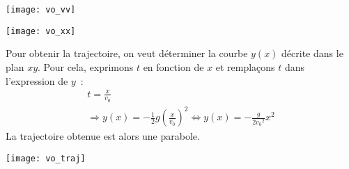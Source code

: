 \documentclass[../main/main.tex]{subfiles}
\begin{document}
\begin{minipage}{0.48\linewidth}
    \begin{center}
        \texttt{[image: vo\_vv]}
    \end{center}
\end{minipage}
\hfill
\begin{minipage}{0.48\linewidth}
    \begin{center}
        \texttt{[image: vo\_xx]}
    \end{center}
\end{minipage} \bigbreak

\begin{minipage}{0.60\linewidth}
    Pour obtenir la trajectoire, on veut déterminer la courbe $y(x)$ décrite dans le
    plan $xy$. Pour cela, exprimons $t$ en fonction de $x$ et remplaçons $t$ dans
    l'expression de $y$~:
    \begin{gather*}
        t = \frac{x}{v_0}\\
        \Rightarrow
        y(x) = - \frac{1}{2}g \left( \frac{x}{v_0} \right)^2
        \Leftrightarrow
        \boxed{y(x) = - \frac{g}{2v_0{}^2}x^2}
    \end{gather*}
    La trajectoire obtenue est alors une parabole.
\end{minipage}
\hfill
\begin{minipage}{0.35\linewidth}
    \begin{center}
        \texttt{[image: vo\_traj]}
    \end{center}
\end{minipage}
\end{document}
